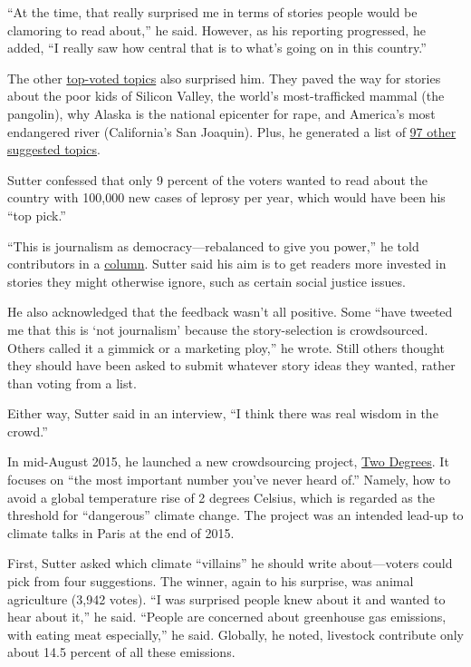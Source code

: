 \begin{itemize}
\begin{itemize}
\begin{enumerate}
``At the time, that really surprised me in terms of stories people would be clamoring to read about,'' he said.\autocite{CNN} However, as his reporting progressed, he added, ``I really saw how central that is to what’s going on in this country.''

The other \href{http://www.cnn.com/2013/06/18/opinion/sutter-ctl-vote-results/}{top-voted topics} also surprised him.\autocite{column} They paved the way for stories about the poor kids of Silicon Valley, the world’s most-trafficked mammal (the pangolin), why Alaska is the national epicenter for rape, and America’s most endangered river (California’s San Joaquin). Plus, he generated a list of \href{http://www.cnn.com/2013/06/14/opinion/sutter-ctl-97-ideas/index.html?hpt=hp_c4}{97 other suggested topics}.\autocite{column} 

Sutter confessed that only 9 percent of the voters wanted to read about the country with 100,000 new cases of leprosy per year, which would have been his ``top pick.''

``This is journalism as democracy---rebalanced to give you power,'' he told contributors in a \href{http://www.cnn.com/2013/06/18/opinion/sutter-ctl-vote-results/index.html}{column}.\autocite{column} Sutter said his aim is to get readers more invested in stories they might otherwise ignore, such as certain social justice issues.  

He also acknowledged that the feedback wasn’t all positive. Some 
``have tweeted me that this is ‘not journalism’ because the story-selection is crowdsourced. Others called it a gimmick or a marketing ploy,'' he wrote.\autocite{column} Still others thought they should have been asked to submit whatever story ideas they wanted, rather than voting from a list. 

Either way, Sutter said in an interview, ``I think there was real wisdom in the crowd.''\autocite{CNN}

In mid-August 2015, he launched a new crowdsourcing project, \href{http://www.cnn.com/specials/opinions/two-degrees}{Two Degrees}. It focuses on ``the most important number you’ve never heard of.'' Namely, how to avoid a global temperature rise of 2 degrees Celsius, which is regarded as the threshold for ``dangerous'' climate change.\autocite{CNN} The project was an intended lead-up to climate talks in Paris at the end of 2015. 

First, Sutter asked which climate ``villains'' he should write about---voters could pick from four suggestions. The winner, again to his surprise, was animal agriculture (3,942 votes). ``I was surprised people knew about it and wanted to hear about it,'' he said. ``People are concerned about greenhouse gas emissions, with eating meat especially,'' he said. Globally, he noted, livestock contribute only about 14.5 percent of all these emissions.


\end{enumerate}
\end{itemize}
\end{itemize}
